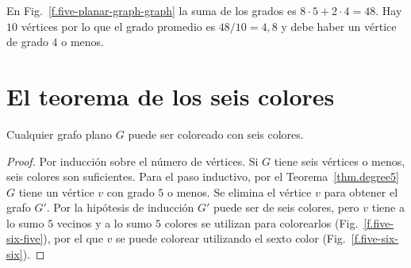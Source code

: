 \begin{example}
En Fig.~\ref{f.five-planar-graph-graph} la suma de los grados es $8\cdot 5 + 2\cdot 4=48$. Hay $10$ vértices por lo que el grado promedio es $48/10=4,8$ y debe haber un vértice de grado $4$ o menos.
\end{example}


\section{El teorema de los seis colores}\label{s.six-color}

\begin{theorem}\label{thm.sixcolor}
Cualquier grafo plano $G$ puede ser coloreado con seis colores.
\end{theorem}
\begin{proof}
Por inducción sobre el número de vértices. Si $G$ tiene seis vértices o menos, seis colores son suficientes. Para el paso inductivo, por el Teorema~\ref{thm.degree5} $G$ tiene un vértice $v$ con grado $5$ o menos. Se elimina el vértice $v$ para obtener el grafo $G'$. Por la hipótesis de inducción $G'$ puede ser de seis colores, pero $v$ tiene a lo sumo $5$ vecinos y a lo sumo $5$ colores se utilizan para colorearlos (Fig.~\ref{f.five-six-five}), por el que $v$ se puede colorear utilizando el sexto color (Fig.~\ref{f.five-six-six}).
\end{proof}

